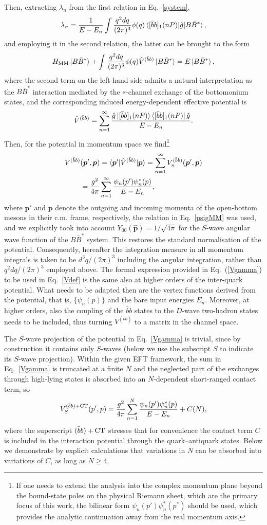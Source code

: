 \documentclass[aps,prd,showpacs,amsmath,twocolumn,superscriptaddress,floatfix,nofootinbib,notitlepage]{revtex4-2}
\newcommand{\bbnP}{[\bar{b}b]_1(nP)}
\newcommand{\vep}{{\bm p}}
\newcommand{\be}{\begin{equation}}
\newcommand{\ee}{\end{equation}}
\newcommand{\intk}{\int\frac{q^2dq}{(2\pi)^3}}
\newcommand{\QQ}{\bar{b}b}
\newcommand{\Hoo}{H_{\rm MM}}
\newcommand{\En}{E_n}
\newcommand{\VQQ}{V^{(\bar{b}b)}}
\begin{document}
Then, extracting $\lambda_n$ from the first relation in Eq.~\eqref{system},
\be
\lambda_n=\frac{1}{E-\En}\intk \phi(q)\braket{\bbnP|\hat{g}|B\bar{B}^*},
\label{eq:lamn}
\ee
and employing it in the second relation, the latter can be brought to the form
\be
\Hoo\ket{B\bar{B}^*}+\int \frac{q^2dq}{(2\pi)^3} \phi(q)\hat{V}^{(\QQ)}\ket{B\bar{B}^*}=E\ket{B\bar{B}^*},
\label{BBsttransitions}
\ee
where the second term on the left-hand side admits a natural interpretation as the $B\bar{B}^*$ interaction mediated by the $s$-channel exchange of the bottomonium states, and the corresponding induced energy-dependent effective potential is
\be
\hat{V}^{(\QQ)}
=
\sum_{n=1}^{\infty}
\frac{\hat g\ket{\bbnP}
\bra{\bbnP}\hat g}{E-E_n} .
\ee
Then, for the potential in momentum space we find\footnote{If one needs to extend the analysis into the complex momentum plane beyond the bound-state poles on the physical Riemann sheet, which are the primary focus of this work, the bilinear form $\psi_n(p')\psi_n^*(p^*)$ should be used, which provides the analytic continuation
away from the real momentum axis.}
\be
\begin{split}
\VQQ&(\vep',\vep)=\braket{\vep'|\hat{V}^{(\QQ)}|\vep}=\sum_{n=1}^\infty \VQQ_n(\vep',\vep)\\
&=\frac{g^2}{4\pi}\sum_{n=1}^\infty\frac{\psi_n(p')\psi_n^*(p)}{E-\En},
\end{split}
\label{Vgamma}
\ee
where $\vep'$ and $\vep$ denote the outgoing and incoming momenta of the open-bottom mesons in their c.m. frame, respectively, the relation in Eq.~\eqref{psigMM} was used, and
we explicitly took into account $Y_{00}(\hat{\vep})=1/\sqrt{4\pi}$ for the $S$-wave angular wave function of the $B\bar{B}^*$ system. This restores the standard normalisation of the potential. Consequently, hereafter the integration measure in all momentum integrals is taken to be $d^3q/(2\pi)^3$ including the angular integration, rather than $q^2dq/(2\pi)^3$ employed above.
The formal expression provided in Eq.~(\ref{Vgamma}) to be used in Eq.~\eqref{Vdef} is the same also 
at higher orders of the inter-quark potential. What needs to be adapted then are the vertex functions derived from the potential, that is, $\{\psi_n(p)\}$ and the bare input energies $E_n$. Moreover, at higher orders, also the coupling of the $\bar{b}b$ states to the $D$-wave two-hadron states needs to be included, thus turning $V^{(\bar{b}b)}$ to a matrix in the channel space.

The $S$-wave projection of the potential in Eq.~\eqref{Vgamma} is trivial, since by construction it contains only $S$-waves
(below we use the subscript $S$ to indicate its $S$-wave projection). Within the given EFT framework,
the sum in Eq.~\eqref{Vgamma} is truncated at a finite $N$ and the
neglected part of the exchanges through high-lying states is absorbed into an $N$-dependent short-ranged contact term, so
\be
V^{(\QQ)+{\rm CT}}_S(p',p)=\frac{g^2}{4\pi}
\sum_{n=1}^N\frac{\psi_n(p')\psi^*_n(p)}{E-\En}+C(N),
\label{VQMab}
\ee
where the superscript $(\QQ)+\rm{CT}$ stresses that for convenience the contact term $C$ is included in the interaction potential through the quark--antiquark states.
Below we demonstrate by explicit calculations that variations in $N$ can be absorbed into variations of $C$,
as long as $N\geqslant 4$.
\end{document}

